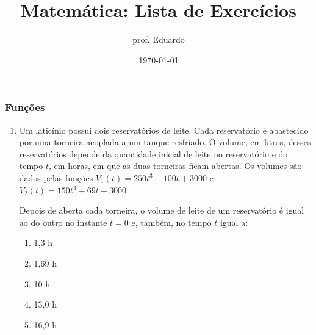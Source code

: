 \documentclass[aspectratio=169, t, 8pt]{beamer}
\title{Matemática: Lista de Exercícios}
\author{prof. Eduardo}
\institute{Pré-Universitário Oficina do Saber / UFF}
\date{\today}
\newcounter{questaovest}
\newcommand{\vest}[1]{\stepcounter{questaovest}\item[\textbf{Questão \arabic{questaovest}} (#1):]}
\begin{document}
    \begin{frame}
        \titlepage
    \end{frame}
   
    \begin{frame}
        \frametitle{Funções}
        
        \begin{enumerate}
            \vest{ENEM}Um laticínio possui dois reservatórios de leite. Cada reservatório é abastecido por uma torneira acoplada a um tanque resfriado. O volume, em litros, desses reservatórios depende da quantidade inicial de leite no reservatório e do tempo $t$, em horas, em que as duas torneiras ficam abertas. Os volumes são dados pelas funções $V_1(t) = 250t^3 - 100t + 3000$ e $V_2(t) = 150t^3 + 69t + 3000$
            
            Depois de aberta cada torneira, o volume de leite de um reservatório é igual ao do outro no instante $t = 0$ e, também, no tempo $t$ igual a:
            \vspace{1em}
            \begin{enumerate}
                \item 1,3 h
                \item 1,69 h
                \item 10 h
                \item 13,0 h
                \item 16,9 h
            \end{enumerate}

        \end{enumerate}
    \end{frame}
\end{document}
